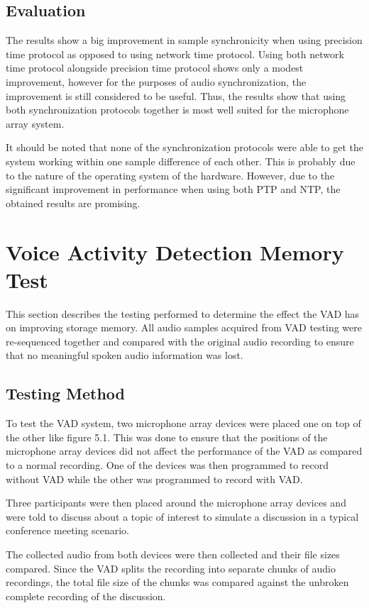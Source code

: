 \documentclass[hidelinks,12pt]{report} %
\begin{document}
\subsection{Evaluation}

The results show a big improvement in sample synchronicity when using precision time protocol as opposed to using network time protocol. Using both network time protocol alongside precision time protocol shows only a modest improvement, however for the purposes of audio synchronization, the improvement is still considered to be useful. Thus, the results show that using both synchronization protocols together is most well suited for the microphone array system. 

It should be noted that none of the synchronization protocols were able to get the system working within one sample difference of each other. This is probably due to the nature of the operating system of the hardware. However, due to the significant improvement in performance when using both PTP and NTP, the obtained results are promising. 

\section{Voice Activity Detection Memory Test}

This section describes the testing performed to determine the effect the VAD has on improving storage memory. All audio samples acquired from VAD testing were re-sequenced together and compared with the original audio recording to ensure that no meaningful spoken audio information was lost.  

\subsection{Testing Method}

To test the VAD system, two microphone array devices were placed one on top of the other like figure 5.1. This was done to ensure that the positions of the microphone array devices did not affect the performance of the VAD as compared to a normal recording. One of the devices was then programmed to record without VAD while the other was programmed to record with VAD. 

Three participants were then placed around the microphone array devices and were told to discuss about a topic of interest to simulate a discussion in a typical conference meeting scenario. 

The collected audio from both devices were then collected and their file sizes compared. Since the VAD splits the recording into separate chunks of audio recordings, the total file size of the chunks was compared against the unbroken complete recording of the discussion.
\end{document}
